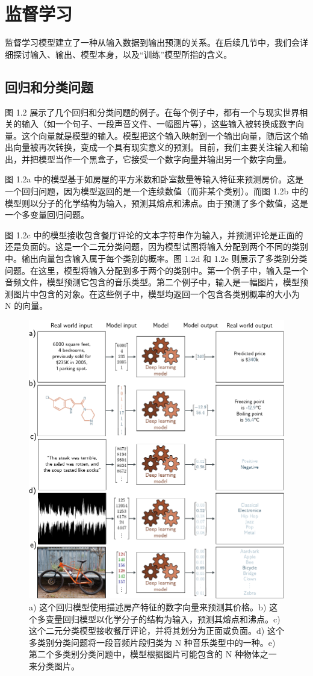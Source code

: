 \documentclass[lang=cn,newtx,10pt,scheme=chinese]{elegantbook}
\begin{document}
\section{监督学习}
监督学习模型建立了一种从输入数据到输出预测的关系。在后续几节中，我们会详细探讨输入、输出、模型本身，以及“训练”模型所指的含义。

\subsection{回归和分类问题}
图 1.2 展示了几个回归和分类问题的例子。在每个例子中，都有一个与现实世界相关的输入（如一个句子、一段声音文件、一幅图片等），这些输入被转换成数字向量。这个向量就是模型的输入。模型把这个输入映射到一个输出向量，随后这个输出向量被再次转换，变成一个具有现实意义的预测。目前，我们主要关注输入和输出，并把模型当作一个黑盒子，它接受一个数字向量并输出另一个数字向量。

图 1.2a 中的模型基于如房屋的平方米数和卧室数量等输入特征来预测房价。这是一个回归问题，因为模型返回的是一个连续数值（而非某个类别）。而图 1.2b 中的模型则以分子的化学结构为输入，预测其熔点和沸点。由于预测了多个数值，这是一个多变量回归问题。

图 1.2c 中的模型接收包含餐厅评论的文本字符串作为输入，并预测评论是正面的还是负面的。这是一个二元分类问题，因为模型试图将输入分配到两个不同的类别中。输出向量包含输入属于每个类别的概率。图 1.2d 和 1.2e 则展示了多类别分类问题。在这里，模型将输入分配到多于两个的类别中。第一个例子中，输入是一个音频文件，模型预测它包含的音乐类型。第二个例子中，输入是一幅图片，模型预测图片中包含的对象。在这些例子中，模型均返回一个包含各类别概率的大小为 N 的向量。

\begin{figure}
	\centering
	\includegraphics[width=0.7\linewidth]{PDFFigures/UDLChap1PDF/IntroModels.pdf}
	\caption{a) 这个回归模型使用描述房产特征的数字向量来预测其价格。b) 这个多变量回归模型以化学分子的结构为输入，预测其熔点和沸点。c) 这个二元分类模型接收餐厅评论，并将其划分为正面或负面。d) 这个多类别分类问题将一段音频片段归类为 N 种音乐类型中的一种。e) 第二个多类别分类问题中，模型根据图片可能包含的 N 种物体之一来分类图片。}
  \label{IntroModels}
\end{figure}
\end{document}
